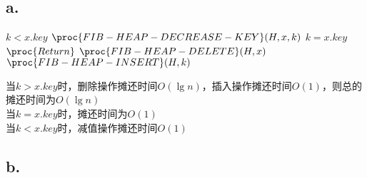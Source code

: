 \documentclass{article}
\begin{document}
  		\subsection*{a.}
  			\begin{codebox}
  				\li \If $k<x.key$
  				\li \Then $\proc{FIB-HEAP-DECREASE-KEY}(H,x,k)$
  				\End
  				\li \If $k=x.key$
  				\li \Then $\proc{Return}$
  				\End
  				\li $\proc{FIB-HEAP-DELETE}(H,x)$
  				\li $\proc{FIB-HEAP-INSERT}(H,k)$
  			\end{codebox}
  			当$k>x.key$时，删除操作摊还时间$O(\lg{n})$，插入操作摊还时间$O(1)$，则总的摊还时间为$O(\lg{n})$ \\
  			当$k=x.key$时，摊还时间为$O(1)$ \\
  			当$k<x.key$时，减值操作摊还时间$O(1)$
  		\subsection*{b.}
  			
\end{document}
